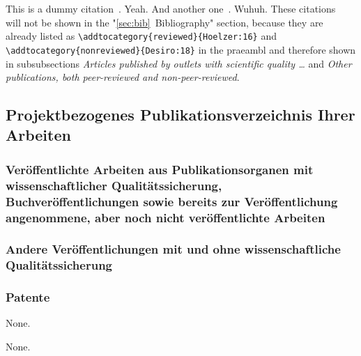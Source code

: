 \documentclass{scrartcl}
\begin{document}
This is a dummy citation~\cite{Hoelzer:17}. Yeah. And another
one~\cite{Gerst:18}. Wuhuh. These citations~\cite{Hoelzer:16, Desiro:18} will
not be shown in the "\ref{sec:bib}~Bibliography" section, because they are
already listed as \verb=\addtocategory{reviewed}{Hoelzer:16}= and
\verb=\addtocategory{nonreviewed}{Desiro:18}= in the praeambl and therefore
shown in subsubsections \emph{Articles published by outlets with scientific
quality \dots} and \emph{Other publications, both peer-reviewed and non-peer-reviewed}. 

\lipsum[1]


\subsection{Projektbezogenes Publikationsverzeichnis Ihrer Arbeiten}

\subsubsection{Veröffentlichte Arbeiten aus Publikationsorganen mit
  wissenschaftlicher Qualitätssicherung, Buchveröffentlichungen sowie
  bereits zur Veröffentlichung angenommene, aber noch nicht
  veröffentlichte Arbeiten}

\newrefcontext[labelprefix=E]
\printbibliography[category=reviewed, heading=none, resetnumbers=false]

\subsubsection{Andere Veröffentlichungen mit und ohne
  wissenschaftliche Qualitätssicherung}
\printbibliography[category=nonreviewed, heading=none]

\subsubsection{Patente}

\printbibliography[category=patents_pending, heading=none]
None.

\printbibliography[category=patents, heading=none]
None.
\end{document}
